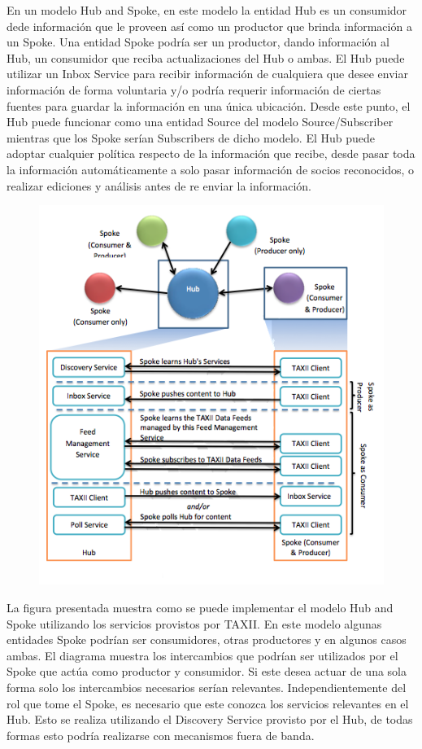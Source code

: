 En un modelo Hub and Spoke, en este modelo la entidad Hub es un consumidor dede 
información que le proveen así como un productor que brinda información a un 
Spoke. Una entidad Spoke podría ser un productor, dando información al Hub, un 
consumidor que reciba actualizaciones del Hub o ambas. El Hub puede utilizar un 
Inbox Service para recibir información de cualquiera que desee enviar 
información de forma voluntaria y/o podría requerir información de ciertas 
fuentes para guardar la información en una única ubicación. Desde este punto, el 
Hub puede funcionar como una entidad Source del modelo Source/Subscriber 
mientras que los Spoke serían Subscribers de dicho modelo. El Hub puede adoptar 
cualquier política respecto de la información que recibe, desde pasar toda la 
información automáticamente a solo pasar información de socios reconocidos, o 
realizar ediciones y análisis antes de re enviar la información.

\begin{figure}[ht!]
  \centering
    \includegraphics[width=150mm]{./Figures/HubAndSpokeModel.png}
\end{figure}
\newpage
La figura presentada muestra como se puede implementar el modelo Hub and Spoke 
utilizando los servicios provistos por TAXII. En este modelo algunas entidades 
Spoke podrían ser consumidores, otras productores y en algunos casos ambas. El 
diagrama muestra los intercambios que podrían ser utilizados por el Spoke que 
actúa como productor y consumidor. Si este desea actuar de una sola forma solo 
los intercambios necesarios serían relevantes. Independientemente del rol que 
tome el Spoke, es necesario que este conozca los servicios relevantes en el Hub. 
Esto se realiza utilizando el Discovery Service provisto por el Hub, de todas 
formas esto podría realizarse con mecanismos fuera de banda.

